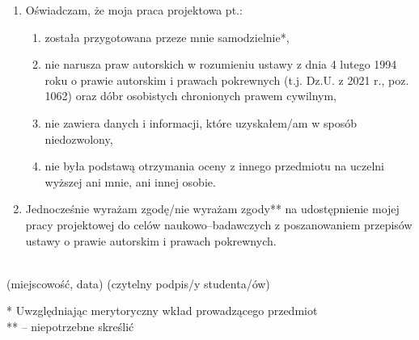 \begin{enumerate}
    \item Oświadczam, że moja praca projektowa pt.: \@titlePL
          \begin{enumerate}[label=\arabic*)]
              \item została przygotowana przeze mnie samodzielnie*,
              \item nie narusza praw autorskich w rozumieniu ustawy z dnia 4 lutego 1994 roku o prawie autorskim i prawach pokrewnych (t.j. Dz.U. z 2021 r., poz. 1062) oraz dóbr osobistych chronionych prawem cywilnym,
              \item nie zawiera danych i informacji, które uzyskałem/am w sposób niedozwolony,
              \item nie była podstawą otrzymania oceny z innego przedmiotu na uczelni wyższej ani mnie, ani innej osobie.
          \end{enumerate}
    \item Jednocześnie wyrażam zgodę/nie wyrażam zgody** na udostępnienie mojej pracy projektowej do celów naukowo--badawczych z poszanowaniem przepisów ustawy o prawie autorskim i prawach pokrewnych.
\end{enumerate}


\vspace*{10mm}

\noindent
\underline{\hspace{6cm}} \hfill \underline{\hspace{6cm}} \\ %
\hspace*{13mm}(miejscowość, data)  \hspace*{60mm}(czytelny podpis/y studenta/ów)
\vspace*{10mm}

\vfill
\noindent
* Uwzględniając merytoryczny wkład prowadzącego przedmiot \\
** -- niepotrzebne skreślić
